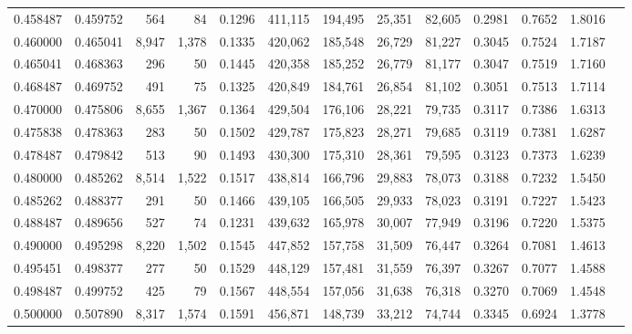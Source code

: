 \begin{tabular}{rrrrrrrrrrrrr}
0.458487 & 0.459752 &    564 &    84 &                                     0.1296 & 411,115 & 194,495 &  25,351 &  82,605 & 0.2981 & 0.7652 & 1.8016 \\
0.460000 & 0.465041 &  8,947 & 1,378 &                                     0.1335 & 420,062 & 185,548 &  26,729 &  81,227 & 0.3045 & 0.7524 & 1.7187 \\
0.465041 & 0.468363 &    296 &    50 &                                     0.1445 & 420,358 & 185,252 &  26,779 &  81,177 & 0.3047 & 0.7519 & 1.7160 \\
0.468487 & 0.469752 &    491 &    75 &                                     0.1325 & 420,849 & 184,761 &  26,854 &  81,102 & 0.3051 & 0.7513 & 1.7114 \\
0.470000 & 0.475806 &  8,655 & 1,367 &                                     0.1364 & 429,504 & 176,106 &  28,221 &  79,735 & 0.3117 & 0.7386 & 1.6313 \\
0.475838 & 0.478363 &    283 &    50 &                                     0.1502 & 429,787 & 175,823 &  28,271 &  79,685 & 0.3119 & 0.7381 & 1.6287 \\
0.478487 & 0.479842 &    513 &    90 &                                     0.1493 & 430,300 & 175,310 &  28,361 &  79,595 & 0.3123 & 0.7373 & 1.6239 \\
0.480000 & 0.485262 &  8,514 & 1,522 &                                     0.1517 & 438,814 & 166,796 &  29,883 &  78,073 & 0.3188 & 0.7232 & 1.5450 \\
0.485262 & 0.488377 &    291 &    50 &                                     0.1466 & 439,105 & 166,505 &  29,933 &  78,023 & 0.3191 & 0.7227 & 1.5423 \\
0.488487 & 0.489656 &    527 &    74 &                                     0.1231 & 439,632 & 165,978 &  30,007 &  77,949 & 0.3196 & 0.7220 & 1.5375 \\
0.490000 & 0.495298 &  8,220 & 1,502 &                                     0.1545 & 447,852 & 157,758 &  31,509 &  76,447 & 0.3264 & 0.7081 & 1.4613 \\
0.495451 & 0.498377 &    277 &    50 &                                     0.1529 & 448,129 & 157,481 &  31,559 &  76,397 & 0.3267 & 0.7077 & 1.4588 \\
0.498487 & 0.499752 &    425 &    79 &                                     0.1567 & 448,554 & 157,056 &  31,638 &  76,318 & 0.3270 & 0.7069 & 1.4548 \\
0.500000 & 0.507890 &  8,317 & 1,574 &                                     0.1591 & 456,871 & 148,739 &  33,212 &  74,744 & 0.3345 & 0.6924 & 1.3778 \\

\end{tabular}
